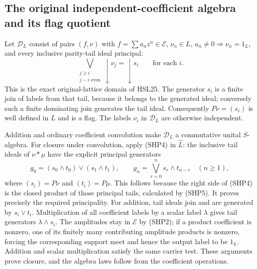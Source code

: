 \subsection{The original independent-coefficient algebra and its flag quotient}

Let $\mathcal D_L$ consist of pairs $(f,\nu)$ with
$f=\sum a_nz^n\in\mathcal E$, $\nu_n\in L$,
$a_n\ne0\Rightarrow\nu_n=1_L$, and every inclusive parity-tail
ideal principal:
\begin{equation}\tag{SHP6}
 \bigvee_{\substack{j\ge i\\j-i\text{ even}}}
       \downarrow\nu_j=\downarrow s_i
                    \qquad\text{for each }i.
\end{equation}
This is the exact original-lattice domain of HSL25.
The generator $s_i$ is a finite join of labels from that
tail, because it belongs to the generated ideal; conversely
such a finite dominating join generates the tail ideal.
Consequently $P\nu=(s_i)$ is well defined in $L$ and is a flag.
The labels $\nu_i$ in $\mathcal D_L$ are otherwise independent.

Addition and ordinary coefficient convolution make $\mathcal D_L$
a commutative unital $S$-algebra.
For closure under convolution, apply (SHP4) in $\widehat L$:
the inclusive tail ideals of $\nu*\mu$ have the explicit
principal generators
\begin{equation}\tag{SHP7}
 g_0=(s_0\wedge t_0)\vee(s_1\wedge t_1),\qquad
 g_n=\bigvee_{r=0}^{n}s_r\wedge t_{n-r}\quad(n\ge1),
\end{equation}
where $(s_i)=P\nu$ and $(t_i)=P\mu$.
This follows because the right side of (SHP4) is the
closed product of those principal tails, calculated by
(SHP5). It proves precisely the required principality.
For addition, tail ideals join and are generated by
$s_i\vee t_i$. Multiplication of all coefficient labels
by a scalar label $\lambda$ gives tail generators
$\lambda\wedge s_i$. The amplitudes stay in $\mathcal E$
by (SHP2); if a product coefficient is nonzero, one of its
finitely many contributing amplitude products is nonzero,
forcing the corresponding support meet and hence the
output label to be $1_L$. Addition and scalar multiplication
satisfy the same carrier test. These arguments prove closure,
and the algebra laws follow from the coefficient operations.

